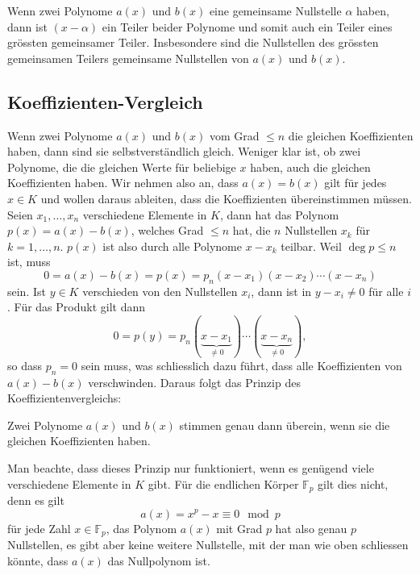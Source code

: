 Wenn zwei Polynome $a(x)$ und $b(x)$ eine gemeinsame Nullstelle $\alpha$
haben, dann ist $(x-\alpha)$ ein Teiler beider Polynome und somit auch
ein Teiler eines grössten gemeinsamer Teiler.
Insbesondere sind die Nullstellen des grössten gemeinsamen Teilers
gemeinsame Nullstellen von $a(x)$ und $b(x)$.

%
%
\subsection{Koeffizienten-Vergleich}
Wenn zwei Polynome $a(x)$ und $b(x)$ vom Grad $\le n$ die gleichen
Koeffizienten haben, dann sind sie selbstverständlich gleich.
Weniger klar ist, ob zwei Polynome, die die gleichen Werte für beliebige
$x$ haben, auch die gleichen Koeffizienten haben.
Wir nehmen also an, dass $a(x)=b(x)$ gilt für jedes $x\in K$ und
wollen daraus ableiten, dass die Koeffizienten übereinstimmen müssen.
Seien $x_1,\dots,x_n$ verschiedene Elemente in $K$, dann
hat das Polynom $p(x)=a(x)-b(x)$, welches Grad $\le n$ hat,
die $n$ Nullstellen $x_k$ für $k=1,\dots,n$.
$p(x)$ ist also durch alle Polynome $x-x_k$ teilbar.
Weil $\deg p\le n$ ist, muss 
\[
0
=
a(x)-b(x)
=
p(x)
=
p_n
(x-x_1)(x-x_2)\cdots (x-x_n)
\]
sein.
Ist $y\in K$ verschieden von den Nullstellen $x_i$, dann ist 
in $y-x_i\ne 0$ für alle $i$.
Für das Produkt gilt dann
\[
0
=
p(y) 
=
p_n
(\underbrace{x-x_1}_{\displaystyle \ne 0})
\cdots
(\underbrace{x-x_n}_{\displaystyle \ne 0}),
\]
so dass $p_n=0$ sein muss, was schliesslich dazu führt, dass alle
Koeffizienten von $a(x)-b(x)$ verschwinden.
Daraus folgt das Prinzip des Koeffizientenvergleichs:
%
%

\begin{satz}[Koeffizientenvergleich]
%
\label{buch:polynome:satz:koeffizientenvergleich}
Zwei Polynome $a(x)$ und $b(x)$ stimmen genau dann überein, wenn
sie die gleichen Koeffizienten haben.
\end{satz}

Man beachte, dass dieses Prinzip nur funktioniert, wenn es genügend
viele verschiedene Elemente in $K$ gibt.
Für die endlichen Körper $\mathbb{F}_p$ gilt dies nicht, denn es gilt
\[
a(x)
=
x^p-x\equiv 0\mod p
\]
für jede Zahl $x\in\mathbb{F}_p$, das Polynom $a(x)$ mit Grad $p$
hat also genau $p$ Nullstellen, es gibt aber keine weitere Nullstelle,
mit der man wie oben schliessen könnte, dass $a(x)$ das Nullpolynom ist.

